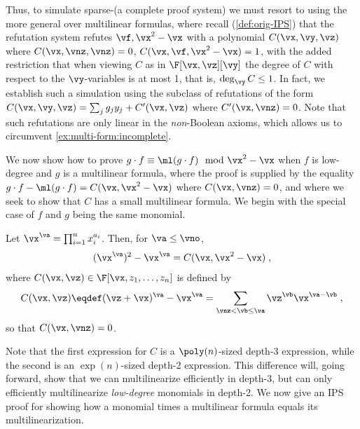 \documentclass{toc}
\begin{document}
Thus, %
to simulate sparse-\lIPS (a complete proof system) we must resort to using the more general \lbIPS over multilinear formulas, where recall (\autoref{def:orig-IPS}) that the \lbIPS refutation system  refutes $\vf,\vx^2-\vx$ with a polynomial $C(\vx,\vy,\vz)$ where $C(\vx,\vnz,\vnz)=0$, $C(\vx,\vf,\vx^2-\vx)=1$, with the added restriction that when viewing $C$ as in $\F[\vx,\vz][\vy]$  the degree of $C$ with respect to the $\vy$-variables is at most 1, that is, $\deg_\vy C\le 1$. In fact, we  establish such a simulation using the subclass of refutations of the form $C(\vx,\vy,\vz)=\sum_j g_j y_j+C'(\vx,\vz)$ where $C'(\vx,\vnz)=0$.  Note that such refutations are only linear in the \emph{non}-Boolean axioms, which allows us to circumvent \autoref{ex:multi-form:incomplete}.

We now show how to prove $g\cdot f\equiv \ml(g\cdot f) \mod \vx^2-\vx$ when $f$ is low-degree and $g$ is a multilinear formula, where the proof is supplied by the equality $g\cdot f-\ml(g\cdot f)=C(\vx,\vx^2-\vx)$ where $C(\vx,\vnz)=0$, and where we seek to show that $C$ has a small multilinear formula.  We begin with the special case of $f$ and $g$ being the same monomial.

\begin{lemmawp}\label{res:multilin:mon}
        Let $\vx^\va=\prod_{i=1}^n x_i^{a_i}$. Then, for $\va\le \vno$,
        \[
                (\vx^{\va})^2-\vx^{\va}
                =C(\vx,\vx^2-\vx)
                \;,
        \]
        where $C(\vx,\vz)\in\F[\vx,z_1,\ldots,z_n]$ is defined by
        \[
                C(\vx,\vz)
                \eqdef
                (\vz+\vx)^\va-\vx^\va
                =\sum_{\vnz<\vb\le \va} \vz^\vb\vx^{\va-\vb}
                \;,
        \]
        so that $C(\vx,\vnz)=0$.
\end{lemmawp}

Note that the first expression for $C$ is a $\poly(n)$-sized depth-3 expression, while the second is an $\exp(n)$-sized depth-2 expression.  This difference will, going forward, show that we can multilinearize efficiently in depth-3, but can only efficiently multilinearize \emph{low-degree} monomials in depth-2. We now give an IPS proof for showing how a monomial times a multilinear formula equals its multilinearization.
\end{document}
